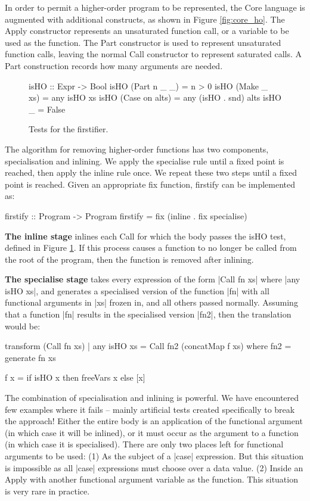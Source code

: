 \documentclass[preprint]{sigplanconf}
\newcommand{\C}[1]{\textsf{#1}}
\newcommand{\para}[1]{\vspace{2mm}\noindent\textbf{#1}}
\begin{document}
In order to permit a higher-order program to be represented, the Core language is augmented with additional constructs, as shown in Figure \ref{fig:core_ho}. The \C{Apply} constructor represents an unsaturated function call, or a variable to be used as the function. The \C{Part} constructor is used to represent unsaturated function calls, leaving the normal \C{Call} constructor to represent saturated calls. A \C{Part} construction records how many arguments are needed.

\begin{figure}
\begin{code}
isHO :: Expr -> Bool
isHO (Part n _ _)    = n > 0
isHO (Make _ xs)     = any isHO xs
isHO (Case on alts)  = any (isHO . snd) alts
isHO _               = False
\end{code}
\caption{Tests for the firstifier.}
\label{fig:isHO}
\end{figure}

The algorithm for removing higher-order functions has two components, specialisation and inlining. We apply the specialise rule until a fixed point is reached, then apply the inline rule once. We repeat these two steps until a fixed point is reached. Given an appropriate \C{fix} function, \C{firstify} can be implemented as:

\begin{code}
firstify :: Program -> Program
firstify = fix (inline . fix specialise)
\end{code}

\para{The \C{inline} stage} inlines each \C{Call} for which the body passes the \C{isHO} test, defined in Figure \ref{fig:isHO}. If this process causes a function to no longer be called from the root of the program, then the function is removed after inlining.

\para{The \C{specialise} stage} takes every expression of the form |Call fn xs| where |any isHO xs|, and generates a specialised version of the function |fn| with all functional arguments in |xs| frozen in, and all others passed normally. Assuming that a function |fn| results in the specialised version |fn2|, then the translation would be:

\begin{code}
transform (Call fn xs) | any isHO xs =
    Call fn2 (concatMap f xs)
    where
    fn2 = generate fn xs

    f x = if isHO x then freeVars x else [x]
\end{code}

The combination of specialisation and inlining is powerful. We have encountered few examples where it fails -- mainly artificial tests created specifically to break the approach! Either the entire body is an application of the functional argument (in which case it will be inlined), or it must occur as the argument to a function (in which case it is specialised). There are only two places left for functional arguments to be used: (1) As the subject of a |case| expression. But this situation is impossible as all |case| expressions must choose over a data value. (2) Inside an \C{Apply} with another functional argument variable as the function. This situation is very rare in practice.
\end{document}
